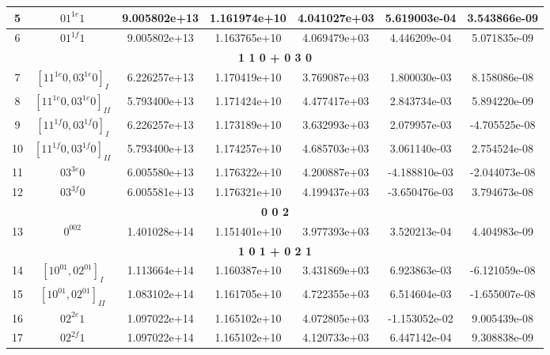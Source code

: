 \begin{table}[h!]
\begin{tabular}{|c|c|c|c|c|c|c|}
5 & $01^{1e}1$ & 9.005802e+13 & 1.161974e+10 & 4.041027e+03 & 5.619003e-04 & 3.543866e-09 \\ \hline
6 & $01^{1f}1$ & 9.005802e+13 & 1.163765e+10 & 4.069479e+03 & 4.446209e-04 & 5.071835e-09 \\ \hline
\multicolumn{7}{|c|}{\textbf{1 1 0 + 0 3 0}} \\ \hline
7 & $[11^{1e}0, 03^{1e}0]_{I}$ & 6.226257e+13 & 1.170419e+10 & 3.769087e+03 & 1.800030e-03 & 8.158086e-08 \\ \hline
8 & $[11^{1e}0, 03^{1e}0]_{II}$ & 5.793400e+13 & 1.171424e+10 & 4.477417e+03 & 2.843734e-03 & 5.894220e-09 \\ \hline
9 & $[11^{1f}0, 03^{1f}0]_{I}$ & 6.226257e+13 & 1.173189e+10 & 3.632993e+03 & 2.079957e-03 & -4.705525e-08 \\ \hline
10 & $[11^{1f}0, 03^{1f}0]_{II}$ & 5.793400e+13 & 1.174257e+10 & 4.685703e+03 & 3.061140e-03 & 2.754524e-08 \\ \hline
11 & $03^{3e}0$ & 6.005580e+13 & 1.176322e+10 & 4.200887e+03 & -4.188810e-03 & -2.044073e-08 \\ \hline
12 & $03^{3f}0$ & 6.005581e+13 & 1.176321e+10 & 4.199437e+03 & -3.650476e-03 & 3.794673e-08 \\ \hline
\multicolumn{7}{|c|}{\textbf{0 0 2}} \\ \hline
13 & $0^002$ & 1.401028e+14 & 1.151401e+10 & 3.977393e+03 & 3.520213e-04 & 4.404983e-09 \\ \hline
\multicolumn{7}{|c|}{\textbf{1 0 1 + 0 2 1}} \\ \hline
14 & $[10^01, 02^01]_{I}$ & 1.113664e+14 & 1.160387e+10 & 3.431869e+03 & 6.923863e-03 & -6.121059e-08 \\ \hline
15 & $[10^01, 02^01]_{II}$ & 1.083102e+14 & 1.161705e+10 & 4.722355e+03 & 6.514604e-03 & -1.655007e-08 \\ \hline
16 & $02^{2e}1$ & 1.097022e+14 & 1.165102e+10 & 4.072805e+03 & -1.153052e-02 & 9.005439e-08 \\ \hline
17 & $02^{2f}1$ & 1.097022e+14 & 1.165102e+10 & 4.120733e+03 & 6.447142e-04 & 9.308838e-09 \\ \hline
\end{tabular}
\end{table}


